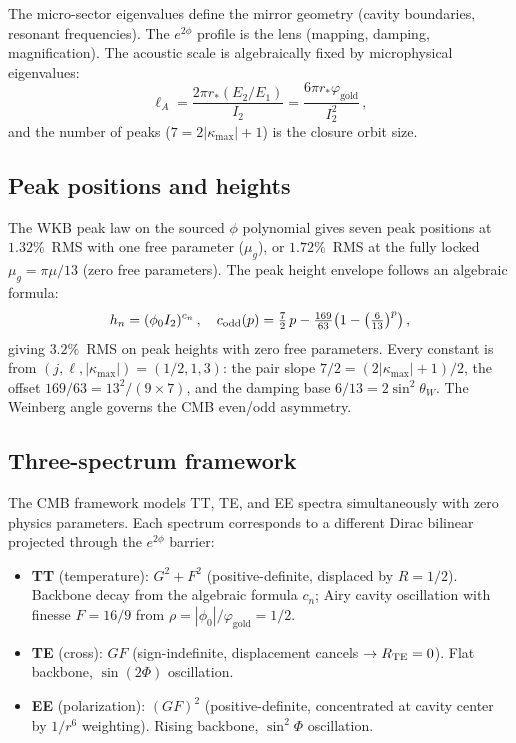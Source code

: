 \documentclass[aps,prd,twocolumn,superscriptaddress,nofootinbib,longbibliography]{revtex4-2}
\newcommand{\rstar}{r_{*}}
\newcommand{\phiz}{\phi_0}
\newcommand{\kmax}{|\kappa_{\mathrm{max}}|}
\newcommand{\vgold}{\varphi_{\mathrm{gold}}}
\newcommand{\mug}{\mu_g}
\begin{document}
The micro-sector eigenvalues define the mirror geometry (cavity
boundaries, resonant frequencies).  The $e^{2\phi}$ profile is the
lens (mapping, damping, magnification).  The acoustic scale is
algebraically fixed by microphysical eigenvalues:
\begin{equation}
  \ell_A = \frac{2\pi\rstar(E_2/E_1)}{I_2}
  = \frac{6\pi\rstar\vgold}{I_2^2}\,,
\end{equation}
and the number of peaks ($7 = 2\kmax + 1$) is the closure orbit size.

\subsection{Peak positions and heights}

The WKB peak law on the sourced $\phi$ polynomial gives seven peak
positions at $1.32\%$~RMS with one free parameter ($\mug$), or
$1.72\%$~RMS at the fully locked $\mug = \pi\mu/13$ (zero free
parameters).  The peak height envelope follows an algebraic formula:
\begin{equation}\label{eq:cn}
  h_n = (\phiz I_2)^{c_n}\,,
  \quad c_{\rm odd}(p) = \tfrac{7}{2}\,p
  - \tfrac{169}{63}\bigl(1 - \bigl(\tfrac{6}{13}\bigr)^p\bigr)\,,
\end{equation}
giving $3.2\%$~RMS on peak heights with zero free parameters.
Every constant is from $(j,\ell,\kmax) = (1/2,1,3)$: the pair
slope $7/2 = (2\kmax+1)/2$, the offset $169/63 = 13^2/(9 \times 7)$,
and the damping base $6/13 = 2\sin^2\!\theta_W$.  The Weinberg angle
governs the CMB even/odd asymmetry.

\subsection{Three-spectrum framework}

The CMB framework models TT, TE, and EE spectra simultaneously with
zero physics parameters.  Each spectrum corresponds to a different
Dirac bilinear projected through the $e^{2\phi}$ barrier:
\begin{itemize}
\item \textbf{TT} (temperature): $G^2 + F^2$ (positive-definite,
  displaced by $R = 1/2$).  Backbone decay from the algebraic formula
  $c_n$; Airy cavity oscillation with finesse $F = 16/9$ from
  $\rho = |\phiz|/\vgold = 1/2$.
\item \textbf{TE} (cross): $GF$ (sign-indefinite, displacement
  cancels $\to R_{\rm TE} = 0$).  Flat backbone, $\sin(2\Phi)$
  oscillation.
\item \textbf{EE} (polarization): $(GF)^2$ (positive-definite,
  concentrated at cavity center by $1/r^6$ weighting).  Rising
  backbone, $\sin^2\!\Phi$ oscillation.
\end{itemize}
\end{document}
